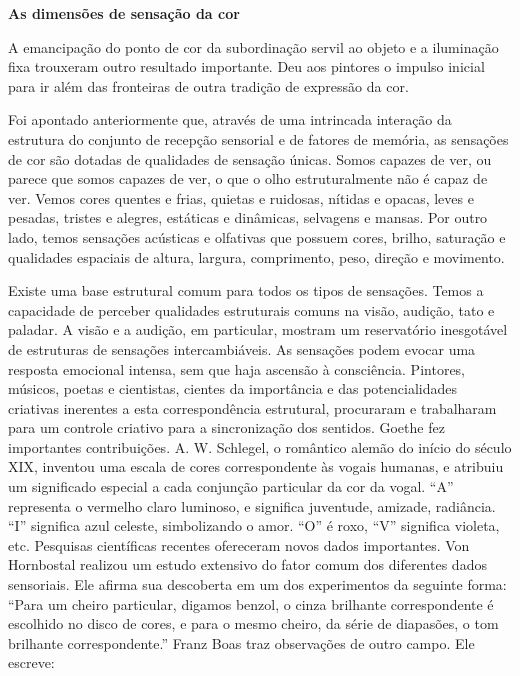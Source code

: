\documentclass[a4paper]{article}
\begin{document}
\large\textbf{As dimensões de sensação da cor}

\vspace{1em} %

A emancipação do ponto de cor da subordinação servil ao objeto e a iluminação fixa trouxeram outro resultado importante. Deu aos pintores o impulso inicial para ir além das fronteiras de outra tradição de expressão da cor.

Foi apontado anteriormente que, através de uma intrincada interação da estrutura do conjunto de recepção sensorial e de fatores de memória, as sensações de cor são dotadas de qualidades de sensação únicas. Somos capazes de ver, ou parece que somos capazes de ver, o que o olho estruturalmente não é capaz de ver. Vemos cores quentes e frias, quietas e ruidosas, nítidas e opacas, leves e pesadas, tristes e alegres, estáticas e dinâmicas, selvagens e mansas. Por outro lado, temos sensações acústicas e olfativas que possuem cores, brilho, saturação e qualidades espaciais de altura, largura, comprimento, peso, direção e movimento.

Existe uma base estrutural comum para todos os tipos de sensações. Temos a capacidade de perceber qualidades estruturais comuns na visão, audição, tato e paladar. A visão e a audição, em particular, mostram um reservatório inesgotável de estruturas de sensações intercambiáveis. As sensações podem evocar uma resposta emocional intensa, sem que haja ascensão à consciência. Pintores, músicos, poetas e cientistas, cientes da importância e das potencialidades criativas inerentes a esta correspondência estrutural, procuraram e trabalharam para um controle criativo para a sincronização dos sentidos. Goethe fez importantes contribuições. A. W. Schlegel, o romântico alemão do início do século XIX, inventou uma escala de cores correspondente às vogais humanas, e atribuiu um significado especial a cada conjunção particular da cor da vogal. ``A'' representa o vermelho claro luminoso, e significa juventude, amizade, radiância. ``I'' significa azul celeste, simbolizando o amor. ``O'' é roxo, ``V'' significa violeta, etc. Pesquisas científicas recentes ofereceram novos dados importantes. Von Hornbostal realizou um estudo extensivo do fator comum dos diferentes dados sensoriais. Ele afirma sua descoberta em um dos experimentos da seguinte forma: ``Para um cheiro particular, digamos benzol, o cinza brilhante correspondente é escolhido no disco de cores, e para o mesmo cheiro, da série de diapasões, o tom brilhante correspondente.'' Franz Boas traz observações de outro campo. Ele escreve:
\end{document}
